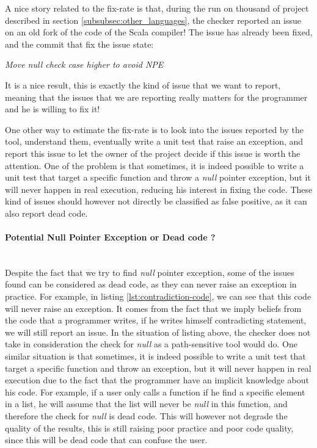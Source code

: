 A nice story related to the fix-rate is that, during the run on thousand of project described in section \ref{subsubsec:other_languages}, the checker reported an issue on an old fork of the code of the Scala compiler! 
The issue has already been fixed, and the commit that fix the issue state:

\begin{displayquote}
	\centering
	\textit{Move null check case higher to avoid NPE}
\end{displayquote}

It is a nice result, this is exactly the kind of issue that we want to report, meaning that the issues that we are reporting really matters for the programmer and he is willing to fix it!

One other way to estimate the fix-rate is to look into the issues reported by the tool, understand them, eventually write a unit test that raise an exception, and report this issue to let the owner of the project decide if this issue is worth the attention.
One of the problem is that sometimes, it is indeed possible to write a unit test that target a specific function and throw a \emph{null} pointer exception, but it will never happen in real execution, reducing his interest in fixing the code.
These kind of issues should however not directly be classified as false positive, as it can also report dead code.



\paragraph{Potential Null Pointer Exception or Dead code ?}\mbox{}\\
\label{subsubsec:dead_code}
Despite the fact that we try to find \emph{null} pointer exception, some of the issues found can be considered as dead code, as they can never raise an exception in practice. 
For example, in listing \ref{lst:contradiction-code}, we can see that this code will never raise an exception. 
It comes from the fact that we imply beliefs from the code that a programmer writes, if he writes himself contradicting statement, we will still report an issue.
In the situation of listing above, the checker does not take in consideration the check for \emph{null} as a path-sensitive tool would do. \newline
One similar situation is that sometimes, it is indeed possible to write a unit test that target a specific function and throw an exception, but it will never happen in real execution due to the fact that the programmer have an implicit knowledge about his code. 
For example, if a user only calls a function if he find a specific element in a list, he will assume that the list will never be \emph{null} in this function, and therefore the check for \emph{null} is dead code. 
This will however not degrade the quality of the results, this is still raising poor practice and poor code quality, since this will be dead code that can confuse the user.


